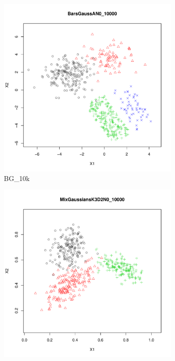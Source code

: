 \begin{figure}[!htb]
        \centering
        \begin{subfigure}[t]{0.4\textwidth}
                \includegraphics[width=\textwidth]{figures/datasets/BarsGaussAN0_10000}
                \caption{BG\_10k}
                \label{Fig:BarGauss}
        \end{subfigure}%
        \qquad %
        \begin{subfigure}[t]{0.4\textwidth}
                \includegraphics[width=\textwidth]{figures/datasets/MixGaussiansK3D2N0_10000}

\end{subfigure}
\end{figure}
